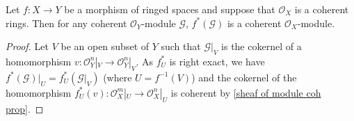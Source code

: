 \begin{proposition}\label{sheaf of module coh pullback if coh sheaf of ring}
Let $f:X\to Y$ be a morphism of ringed spaces and suppose that $\mathscr{O}_X$ is a coherent rings. Then for any coherent $\mathscr{O}_Y$-module $\mathscr{G}$, $f^*(\mathscr{G})$ is a coherent $\mathscr{O}_X$-module.
\end{proposition}
\begin{proof}
Let $V$ be an open subset of $Y$ such that $\mathscr{G}|_V$ is the cokernel of a homomorphism $v:\mathscr{O}_Y^n|_V\to\mathscr{O}_Y^n|_V$. As $f_U^*$ is right exact, we have $f^*(\mathscr{G})|_U=f_U^*(\mathscr{G}|_V)$ (where $U=f^{-1}(V)$) and the cokernel of the homomorphism $f_U^*(v):\mathscr{O}_X^m|_U\to\mathscr{O}_X^n|_U$ is coherent by \cref{sheaf of module coh prop}. 
\end{proof}
